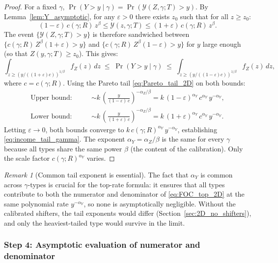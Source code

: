 \documentclass[12pt,a4paper]{article}
\theoremstyle{definition}
\theoremstyle{plain}
\theoremstyle{remark}
\newtheorem{remark}{Remark}[section]
\newcommand{\calY}{\mathcal{Y}}
\begin{document}
\begin{proof}
For a fixed $\gamma$, $\Pr(Y > y \mid \gamma) = \Pr(\calY(Z,\gamma;T) > y)$.  By Lemma~\ref{lem:Y_asymptotic}, for any $\varepsilon > 0$ there exists $z_0$ such that for all $z \geq z_0$:
\[
  (1-\varepsilon)\,c(\gamma;R)\,z^{\beta} \leq \calY(z,\gamma;T) \leq (1+\varepsilon)\,c(\gamma;R)\,z^{\beta}.
\]
The event $\{\calY(Z,\gamma;T) > y\}$ is therefore sandwiched between $\{c(\gamma;R)\,Z^{\beta}(1+\varepsilon) > y\}$ and $\{c(\gamma;R)\,Z^{\beta}(1-\varepsilon) > y\}$ for $y$ large enough (so that $Z(y,\gamma;T) \geq z_0$).  This gives:
\[
  \int_{z \geq (y/((1+\varepsilon)c))^{1/\beta}} f_Z(z)\,dz
  \;\leq\; \Pr(Y > y \mid \gamma) \;\leq\;
  \int_{z \geq (y/((1-\varepsilon)c))^{1/\beta}} f_Z(z)\,dz,
\]
where $c = c(\gamma;R)$.  Using the Pareto tail \eqref{eq:Pareto_tail_2D} on both bounds:
\begin{align*}
  \text{Upper bound:} \qquad &\sim k\,\left(\frac{y}{(1-\varepsilon)\,c}\right)^{-\alpha_Z/\beta} = k\,(1-\varepsilon)^{\alpha_Y}\,c^{\alpha_Y}\,y^{-\alpha_Y}, \\
  \text{Lower bound:} \qquad &\sim k\,\left(\frac{y}{(1+\varepsilon)\,c}\right)^{-\alpha_Z/\beta} = k\,(1+\varepsilon)^{\alpha_Y}\,c^{\alpha_Y}\,y^{-\alpha_Y}.
\end{align*}
Letting $\varepsilon \to 0$, both bounds converge to $k\,c(\gamma;R)^{\alpha_Y}\,y^{-\alpha_Y}$, establishing \eqref{eq:income_tail_gamma}.  The exponent $\alpha_Y = \alpha_Z/\beta$ is the same for every $\gamma$ because all types share the same power $\beta$ (the content of the calibration).  Only the scale factor $c(\gamma;R)^{\alpha_Y}$ varies.
\end{proof}

\begin{remark}[Common tail exponent is essential]
\label{rem:common_tail}
The fact that $\alpha_Y$ is common across $\gamma$-types is crucial for the top-rate formula: it ensures that all types contribute to both the numerator and denominator of \eqref{eq:FOC_top_2D} at the same polynomial rate $y^{-\alpha_Y}$, so none is asymptotically negligible.  Without the calibrated shifters, the tail exponents would differ (Section~\ref{sec:2D_no_shifters}), and only the heaviest-tailed type would survive in the limit.
\end{remark}

\subsubsection{Step 4: Asymptotic evaluation of numerator and denominator}
\end{document}
